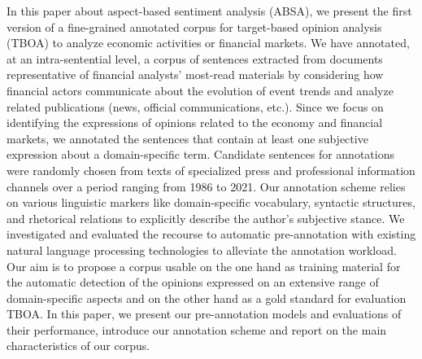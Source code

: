 In this paper about aspect-based sentiment analysis (ABSA), we present the first version of a fine-grained annotated corpus for target-based opinion analysis (TBOA) to analyze economic activities or financial markets. We have annotated, at an intra-sentential level, a corpus of sentences extracted from documents representative of financial analysts' most-read materials by considering how financial actors communicate about the evolution of event trends and analyze related publications (news, official communications, etc.). Since we focus on identifying the expressions of opinions related to the economy and financial markets, we annotated the sentences that contain at least one subjective expression about a domain-specific term. Candidate sentences for annotations were randomly chosen from texts of specialized press and professional information channels over a period ranging from 1986 to 2021. Our annotation scheme relies on various linguistic markers like domain-specific vocabulary, syntactic structures, and rhetorical relations to explicitly describe the author's subjective stance. We investigated and evaluated the recourse to automatic pre-annotation with existing natural language processing technologies to alleviate the annotation workload. Our aim is to propose a corpus usable on the one hand as training material for the automatic detection of the opinions expressed on an extensive range of domain-specific aspects and on the other hand as a gold standard for evaluation TBOA. In this paper, we present our pre-annotation models and evaluations of their performance, introduce our annotation scheme and report on the main characteristics of our corpus.
